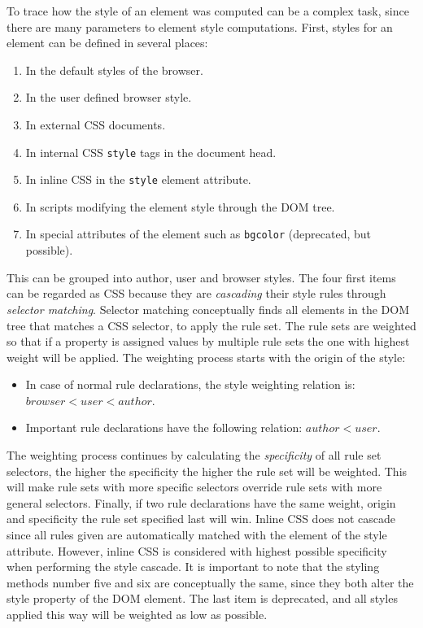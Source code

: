 \documentclass[a4paper,11pt]{kth-mag}
\newcommand{\code}[1]{\texttt{#1}}
\newcommand\abbr[2][]{\uppercase{#2}\ifthenelse{\equal{#1}{}}%
                     {}{#1}}
\begin{document}
        To trace how the style of an element was computed can be a complex task, since there are many parameters to element style computations.
        First, styles for an element can be defined in several places:
        \begin{enumerate}
          \item In the default styles of the browser.
          \item In the user defined browser style.
          \item In external \abbr{css} documents.
          \item In internal \abbr{css} \code{style} tags in the document head.
          \item In inline \abbr{css} in the \code{style} element attribute.
          \item In scripts modifying the element style through the \abbr{dom} tree.
          \item In special attributes of the element such as \code{bgcolor} (deprecated, but possible).
        \end{enumerate}
        This can be grouped into author, user and browser styles.
        The four first items can be regarded as \abbr{css} because they are \emph{cascading} their style rules through \emph{selector matching}.
        Selector matching conceptually finds all elements in the \abbr{dom} tree that matches a \abbr{css} selector, to apply the rule set.
        The rule sets are weighted so that if a property is assigned values by multiple rule sets the one with highest weight will be applied.
        The weighting process starts with the origin of the style:
        \begin{itemize}
          \item In case of normal rule declarations, the style weighting relation is: $browser < user < author$.
          \item Important rule declarations have the following relation: $author < user$.
        \end{itemize}
        The weighting process continues by calculating the \emph{specificity} of all rule set selectors, the higher the specificity the higher the rule set will be weighted.
        This will make rule sets with more specific selectors override rule sets with more general selectors.
        Finally, if two rule declarations have the same weight, origin and specificity the rule set specified last will win.
        Inline \abbr{css} does not cascade since all rules given are automatically matched with the element of the style attribute.
        However, inline \abbr{css} is considered with highest possible specificity when performing the style cascade.
        It is important to note that the styling methods number five and six are conceptually the same, since they both alter the style property of the \abbr{dom} element.
        The last item is deprecated, and all styles applied this way will be weighted as low as possible.
\end{document}
